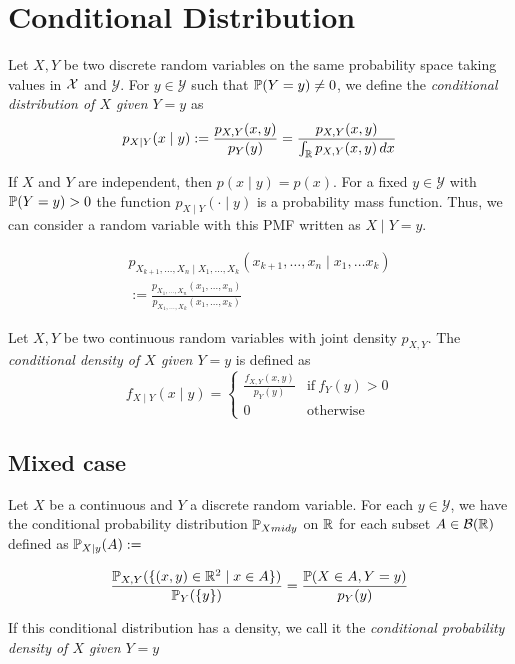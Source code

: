 \section{Conditional Distribution}
\begin{ddefinition*}
  Let \(X, Y\) be two discrete random variables on the same probability space taking values in \(\DX\) and \(\mathcal{Y}\). For \(y \in \mathcal{Y}\) such that \(\P(Y = y) \neq 0\), we define the \textit{conditional distribution of \(X\) given \(Y = y\)} as
  \[p_{X \mid Y}(x \mid y) := \frac{p_{X, Y}(x, y)}{p_Y(y)} = \frac{p_{X, Y}(x, y)}{\int_\R p_{X, Y}(x, y) \,dx}\]
\end{ddefinition*}

If \(X\) and \(Y\) are independent, then \(p(x \mid y) = p(x)\). For a fixed \(y \in \mathcal{Y}\) with \(\P(Y = y) > 0\) the function \(p_{X \mid Y}(\cdot \mid y)\) is a probability mass function. Thus, we can consider a random variable with this PMF written as \(X \mid Y = y\).

\begin{dtheorem*}
  \begin{multline*}
    p_{X_{k+1}, \ldots, X_n \mid X_1, \ldots, X_k}(x_{k+1}, \ldots, x_n \mid x_1, \ldots x_k) \\
    := \frac{p_{X_1, \ldots, X_n}(x_1, \ldots, x_n)}{p_{X_1, \ldots, X_k}(x_1, \ldots, x_k)}
  \end{multline*}
\end{dtheorem*}

\begin{cdefinition*}
  Let \(X, Y\) be two continuous random variables with joint density \(p_{X, Y}\). The \textit{conditional density of \(X\) given \(Y = y\)} is defined as
  \[f_{X \mid Y}(x \mid y) = \begin{cases}
    \frac{f_{X, Y}(x, y)}{p_Y(y)} & \text{if} \ f_Y(y) > 0 \\
    0 & \text{otherwise}
  \end{cases}\]
\end{cdefinition*}

\subsection{Mixed case}
\begin{definition*}
  Let \(X\) be a continuous and \(Y\) a discrete random variable. For each \(y \in \mathcal{Y}\), we have the conditional probability distribution \(\P_{X 
  mid y}\) on \(\R\) for each subset \(A \in \B(\R)\) defined as \(\P_{X \mid y}(A) :=\)
  
  \[\frac{\P_{X, Y}(\{(x, y) \in \R^2 \mid x \in A\})}{\P_Y(\{y\})} = \frac{\P(X \in A, Y = y)}{p_Y(y)}\]
  
  If this conditional distribution has a density, we call it the \textit{conditional probability density of \(X\) given \(Y = y\)}
\end{definition*}

